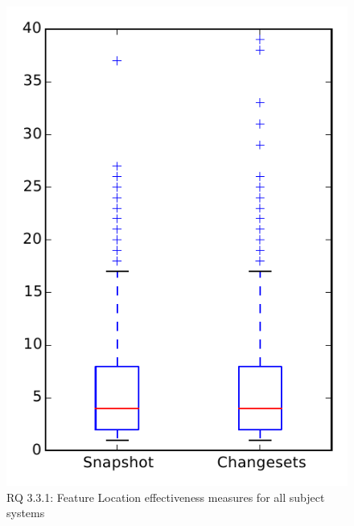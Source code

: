 
\begin{figure}
\centering
\includegraphics[height=0.4\textheight]{figures/flt/rq1_overview}
\caption{RQ 3.3.1: Feature Location effectiveness measures for all subject systems}
\label{fig:flt:rq1:overview}
\end{figure}
